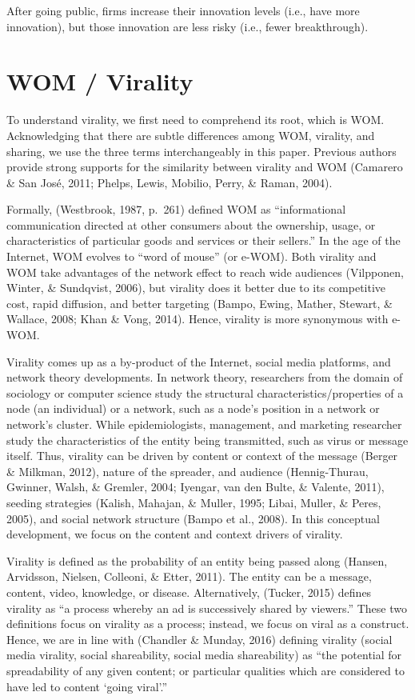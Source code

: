 \documentclass[
]{book}
\begin{document}
After going public, firms increase their innovation levels (i.e., have more innovation), but those innovation are less risky (i.e., fewer breakthrough). \citep{Wies_2015}

\hypertarget{wom-virality}{%
\chapter{WOM / Virality}\label{wom-virality}}

To understand virality, we first need to comprehend its root, which is WOM. Acknowledging that there are subtle differences among WOM, virality, and sharing, we use the three terms interchangeably in this paper. Previous authors provide strong supports for the similarity between virality and WOM (Camarero \& San José, 2011; Phelps, Lewis, Mobilio, Perry, \& Raman, 2004).

Formally, (Westbrook, 1987, p.~261) defined WOM as ``informational communication directed at other consumers about the ownership, usage, or characteristics of particular goods and services or their sellers.'' In the age of the Internet, WOM evolves to ``word of mouse'' (or e-WOM). Both virality and WOM take advantages of the network effect to reach wide audiences (Vilpponen, Winter, \& Sundqvist, 2006), but virality does it better due to its competitive cost, rapid diffusion, and better targeting (Bampo, Ewing, Mather, Stewart, \& Wallace, 2008; Khan \& Vong, 2014). Hence, virality is more synonymous with e-WOM.

Virality comes up as a by-product of the Internet, social media platforms, and network theory developments. In network theory, researchers from the domain of sociology or computer science study the structural characteristics/properties of a node (an individual) or a network, such as a node's position in a network or network's cluster. While epidemiologists, management, and marketing researcher study the characteristics of the entity being transmitted, such as virus or message itself. Thus, virality can be driven by content or context of the message (Berger \& Milkman, 2012), nature of the spreader, and audience (Hennig-Thurau, Gwinner, Walsh, \& Gremler, 2004; Iyengar, van den Bulte, \& Valente, 2011), seeding strategies (Kalish, Mahajan, \& Muller, 1995; Libai, Muller, \& Peres, 2005), and social network structure (Bampo et al., 2008). In this conceptual development, we focus on the content and context drivers of virality.

Virality is defined as the probability of an entity being passed along (Hansen, Arvidsson, Nielsen, Colleoni, \& Etter, 2011). The entity can be a message, content, video, knowledge, or disease. Alternatively, (Tucker, 2015) defines virality as ``a process whereby an ad is successively shared by viewers.'' These two definitions focus on virality as a process; instead, we focus on viral as a construct. Hence, we are in line with (Chandler \& Munday, 2016) defining virality (social media virality, social shareability, social media shareability) as ``the potential for spreadability of any given content; or particular qualities which are considered to have led to content `going viral'.''
\end{document}
